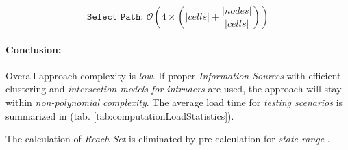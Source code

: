 \begin{equation*}
    \texttt{Select Path: } \mathscr{O}\left(4 \times \left(|cells|+\frac{|nodes|}{|cells|}\right)\right)
\end{equation*}


\paragraph{Conclusion:}  Overall approach complexity is \emph{low}. If proper \emph{Information Sources} with efficient clustering and \emph{intersection models for intruders} are used, the approach will stay within \emph{non-polynomial complexity}. 
The average load time for \emph{testing scenarios} is summarized in (tab. \ref{tab:computationLoadStatistics}).

\begin{note}
    The calculation of \emph{Reach Set} is eliminated by pre-calculation for \emph{state range} \cite{gomola2017obstacle}.
\end{note}